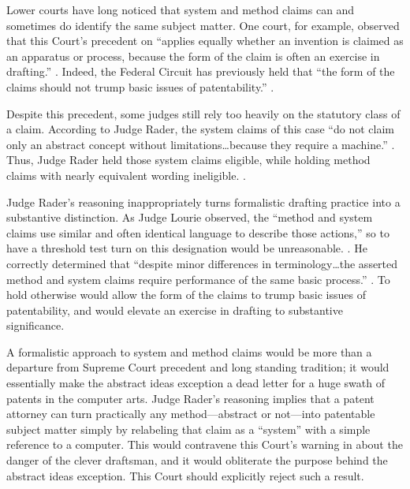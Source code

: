 \documentclass{scotus}
\begin{document}
Lower courts have long noticed that system and method claims can and sometimes
do identify the same subject matter.  One court, for example, observed
that this Court's precedent on  ``applies equally whether an
invention is claimed as an apparatus or process, because the form of the claim
is often an exercise in drafting.'' . Indeed, the Federal Circuit has previously held
that ``the form of the claims should not trump basic issues of patentability.''
.

Despite this precedent, some judges still rely too heavily on
the statutory class of a claim.  According to Judge Rader,
the system claims of this case “do not claim only an abstract concept without
limitations\ldots because they require a machine.” . Thus, Judge Rader held those system claims eligible, while holding
method claims with nearly equivalent wording ineligible. .

Judge Rader’s reasoning inappropriately turns formalistic drafting practice into
a substantive distinction.  As Judge Lourie observed, the “method and system
claims use similar and often identical language to describe those actions,” so
to have a threshold test turn on this designation would be unreasonable.
. He correctly determined that “despite minor
differences in terminology\ldots the asserted method and system claims require
performance of the same basic process.” .  To hold
otherwise would allow the form of the claims to trump basic issues of
patentability, and would elevate an exercise in drafting to substantive
significance.

A formalistic approach to system and method claims would be more than a
departure from Supreme Court precedent and long standing tradition; it would
essentially make the abstract ideas exception a dead letter for a huge swath of
patents in the computer arts. Judge Rader’s reasoning implies that a patent
attorney can turn practically any method---abstract or not---into patentable
subject matter simply by relabeling that claim as a “system” with a simple
reference to a computer.  This would contravene this Court's warning
in 
about the danger of the clever draftsman, and it would obliterate the purpose
behind the
abstract ideas exception. This Court should explicitly reject such a result.
\end{document}
